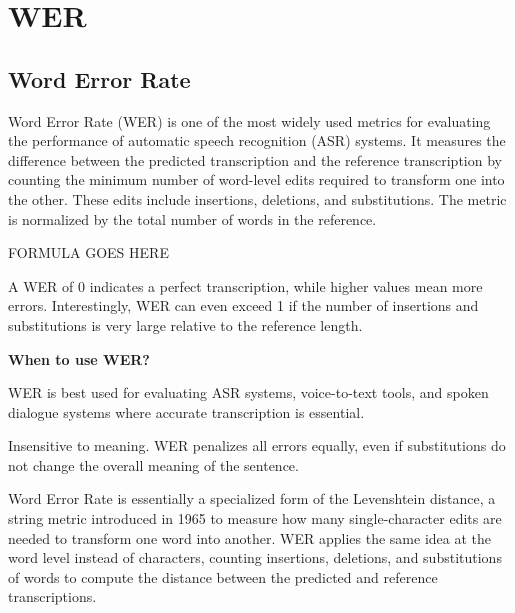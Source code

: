 \clearpage
\thispagestyle{nlpstyle}
\section{WER}
\subsection{Word Error Rate}

Word Error Rate (WER) is one of the most widely used metrics for evaluating the performance of automatic speech recognition (ASR) systems.
It measures the difference between the predicted transcription and the reference transcription by counting the minimum number of word-level edits
required to transform one into the other. These edits include insertions, deletions, and substitutions. The metric is normalized by the total number
of words in the reference.

\begin{center}
    FORMULA GOES HERE
\end{center}

A WER of 0 indicates a perfect transcription, while higher values mean more errors. Interestingly, WER can even exceed 1 if the number of insertions
and substitutions is very large relative to the reference length.

\textbf{When to use WER?}

WER is best used for evaluating ASR systems, voice-to-text tools, and spoken dialogue systems where accurate transcription is essential.

{
\item Insensitive to meaning. WER penalizes all errors equally, even if substitutions do not change the overall meaning of the sentence.
}

\clearpage

{Word Error Rate is essentially a specialized form of the Levenshtein distance, a string metric introduced in 1965 to measure how many
single-character edits are needed to transform one word into another. WER applies the same idea at the word level instead of characters,
counting insertions, deletions, and substitutions of words to compute the distance between the predicted and reference transcriptions.}